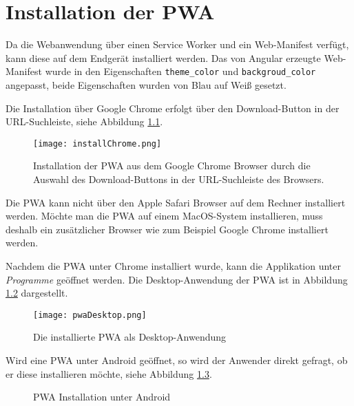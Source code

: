 \chapter{Installation der PWA}

Da die Webanwendung über einen Service Worker und ein Web-Manifest verfügt, kann diese auf dem Endgerät installiert werden. Das von Angular erzeugte Web-Manifest wurde in den Eigenschaften \texttt{theme\_color} und \texttt{backgroud\_color} angepasst, beide Eigenschaften wurden von Blau auf Weiß gesetzt.

Die Installation über Google Chrome erfolgt über den Download-Button in der URL-Suchleiste, siehe Abbildung \ref{img:installChrome}.

\begin{figure}[!htb]
    \centering
    \texttt{[image: installChrome.png]}
    \caption{Installation der PWA aus dem Google Chrome Browser durch die Auswahl des Download-Buttons in der URL-Suchleiste des Browsers.}
    \label{img:installChrome}
\end{figure}

Die PWA kann nicht über den Apple Safari Browser auf dem Rechner installiert werden. Möchte man die PWA auf einem MacOS-System installieren, muss deshalb ein zusätzlicher Browser wie zum Beispiel Google Chrome installiert werden. 

Nachdem die PWA unter Chrome installiert wurde, kann die Applikation unter \textit{Programme} geöffnet werden. Die Desktop-Anwendung der PWA ist in Abbildung \ref{img:desktopPwa} dargestellt.

\begin{figure}[!htb]
    \centering
    \texttt{[image: pwaDesktop.png]}
    \caption{Die installierte PWA als Desktop-Anwendung}
    \label{img:desktopPwa}
\end{figure}


Wird eine PWA unter Android geöffnet, so wird der Anwender direkt gefragt, ob er diese installieren möchte, siehe Abbildung \ref{img:installAndroid}.

\begin{figure}%
    \centering
    \qquad
    \caption{PWA Installation unter Android}%
    \label{img:installAndroid}
  \end{figure}

